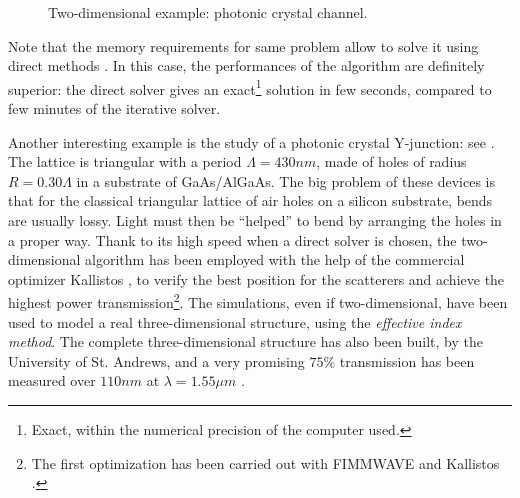 \begin{figure}[htbp]
\begin{center}
  \end{center}
  \caption{Two-dimensional example: photonic crystal channel.}
  \label{fig:2d_channel}
\end{figure}

Note that the memory requirements for same problem allow to solve it
using direct methods \cite{umfpack}. In this case, the performances of
the algorithm are definitely superior: the direct solver gives an
exact\footnote{Exact, within the numerical precision of the computer used.}
solution in few seconds, compared to few minutes of the iterative
solver.

Another interesting example is the study of a photonic crystal
Y-junct\-ion: see . The lattice is triangular with a
period $\Lambda = 430 nm$, made of holes of radius $R = 0.30 \Lambda$
in a substrate of GaAs/AlGaAs.  The big problem of these devices is
that for the classical triangular lattice of air holes on a silicon
substrate, bends are usually lossy. Light must then be ``helped'' to
bend by arranging the holes in a proper way. Thank to its high speed
when a direct solver is chosen, the two-dimensional algorithm has
been employed with the help of the commercial optimizer Kallistos
\cite{kallistos}, to verify the best position for the scatterers and
achieve the highest power transmission\footnote{The first optimization
has been carried out with FIMMWAVE \cite{fimmwave} and Kallistos
\cite{kallistos}.}. The simulations, even if two-dimensional, have
been used to model a real three-dimensional structure, using the
\emph{effective index method}. The complete three-dimensional
structure has also been built, by the University of St. Andrews, and a
very promising $75\%$ transmission has been measured over $110nm$ at
$\lambda = 1.55 \mu m$ \cite{ayre_experimental}.

